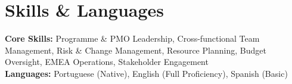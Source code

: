 \documentclass[a4paper,10pt]{article}
\begin{document}
\section{Skills \& Languages}
 \begin{itemize}[leftmargin=0.15in, label={}]
    \small{\item{
     \textbf{Core Skills:}{ Programme \& PMO Leadership, Cross-functional Team Management, Risk \& Change Management, Resource Planning, Budget Oversight, EMEA Operations, Stakeholder Engagement} \\
     \textbf{Languages:}{ Portuguese (Native), English (Full Proficiency), Spanish (Basic)}
    }}
 \end{itemize}

\end{document}
